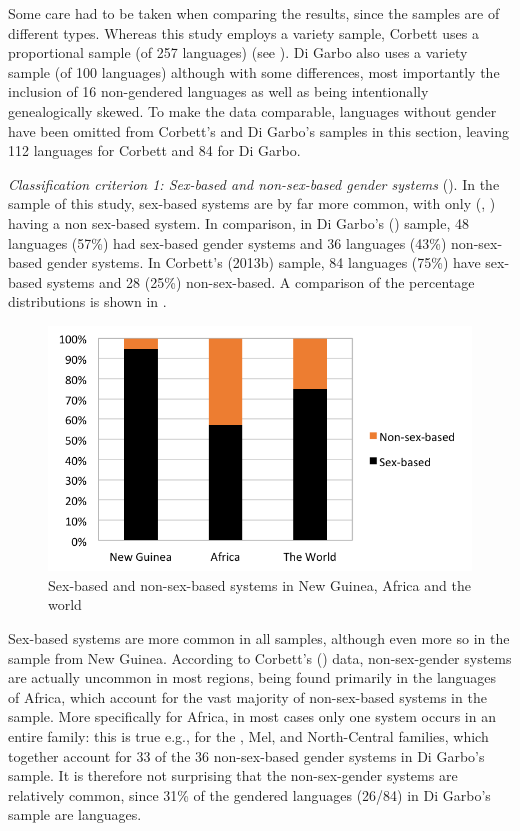 \documentclass[output=collectionpaper]{langsci/langscibook}
\begin{document}
Some care had to be taken when comparing the results, since the samples are of different types. Whereas this study employs a variety sample, Corbett uses a proportional sample (of 257 languages) (see ). Di Garbo also uses a variety sample (of 100 languages) although with some differences, most importantly the inclusion of 16 non-gendered languages as well as being intentionally genealogically skewed. To make the data comparable, languages without gender have been omitted from Corbett's and Di Garbo's samples in this section, leaving 112 languages for Corbett and 84 for Di Garbo.



\textit{Classification criterion 1: Sex-based and non-sex-based gender systems} ().
In the sample of this study, sex-based
 systems are by far more common, with only  (, ) having a non sex-based system. In comparison, in Di Garbo's (\citeyear[63]{DiGarbo2014}) sample, 48 languages (57\%) had sex-based gender systems and 36 languages (43\%) non-sex-based gender systems. In Corbett's (2013b) sample, 84 languages (75\%) have sex-based systems and 28 (25\%) non-sex-based. A comparison of the percentage distributions is shown in .


\begin{figure}
\includegraphics[width=.8\textwidth]{figures/09/fig7.png}
\caption{Sex-based and non-sex-based systems in New Guinea, Africa and the world}
\label{fig:Svard:7}

\end{figure}


Sex-based systems are more common in all samples, although even more so in the sample from New Guinea. According to Corbett's (\citeyear{Corbett2013a}) data, non-sex-gender systems are actually uncommon in most regions, being found primarily in the  languages of Africa, which account for the vast majority of non-sex-based systems in the sample. More specifically for Africa, in most cases only one system occurs in an entire family: this is true e.g., for the , Mel, and North-Central  families, which together account for 33 of the 36 non-sex-based gender systems in Di Garbo's sample. It is therefore not surprising that the non-sex-gender systems are relatively common, since 31\% of the gendered languages (26/84) in Di Garbo's sample are  languages.
\end{document}
